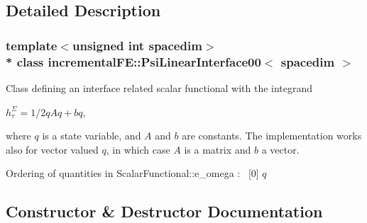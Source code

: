 \subsection{Detailed Description}
\subsubsection*{template$<$unsigned int spacedim$>$\\*
class incremental\+F\+E\+::\+Psi\+Linear\+Interface00$<$ spacedim $>$}

Class defining an interface related scalar functional with the integrand

$h^\Sigma_\tau = 1/2 q A q + b q$,

where $q$ is a state variable, and $A$ and $b$ are constants. The implementation works also for vector valued $q$, in which case $A$ is a matrix and $b$ a vector.

Ordering of quantities in Scalar\+Functional\+::e\+\_\+omega \+:~\newline
 \mbox{[}0\mbox{]} $q$ 

\subsection{Constructor \& Destructor Documentation}
